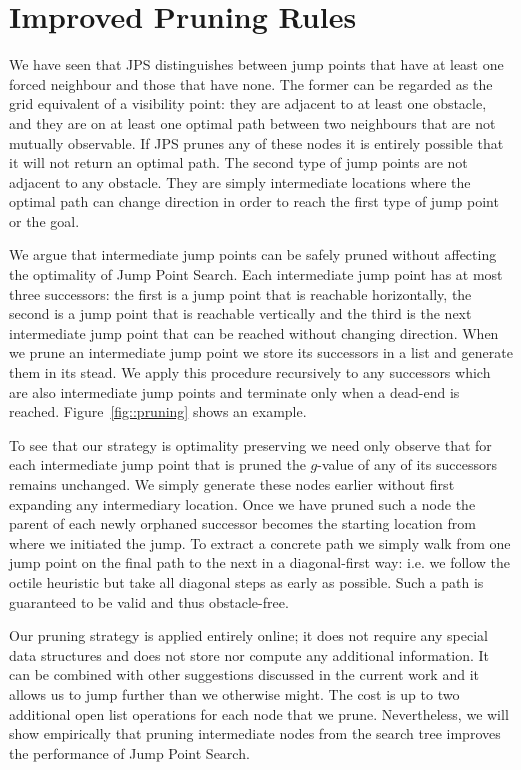 

\section{Improved Pruning Rules}
\label{sec::pruning}
We have seen that JPS distinguishes between jump points that have at least 
one forced neighbour and those that have none.
The former can be regarded as
the grid equivalent of a visibility point: they are adjacent to at least one
obstacle, and they are on at least one optimal path between two neighbours
that are not mutually observable. If JPS prunes any of these nodes it is
entirely possible that it will not return an optimal path.  The second type of
jump points are not adjacent to any obstacle. They are simply intermediate
locations where the optimal path can change direction in order to reach the
first type of jump point or the goal.
\par
We argue that intermediate jump points can be safely pruned without
affecting the optimality of Jump Point Search.  
Each intermediate jump point has at most three successors: the first is a jump 
point that is reachable horizontally, the second is a jump point that is reachable 
vertically and the third is the next intermediate jump point that can be reached 
without changing direction.
When we prune an intermediate jump point we store its successors in a list and
generate them in its stead. We apply this procedure recursively to any
successors which are also intermediate jump points and terminate only when a
dead-end is reached. Figure~\ref{fig::pruning} shows an example.

To see that our strategy is optimality preserving we need only observe that
for each intermediate jump point that is pruned the $g$-value of any of its
successors remains unchanged. We simply generate these nodes earlier without
first expanding any intermediary location.  Once we have pruned such a node 
the parent of each newly orphaned successor becomes the starting location from
where we initiated the jump. To extract a concrete path we simply walk from
one jump point on the final path to the next in a diagonal-first way: i.e. we
follow the octile heuristic but take all diagonal steps as early as possible.
Such a path is guaranteed to be valid and thus obstacle-free.

Our pruning strategy is applied entirely online; it does not require any
special data structures and does not store nor compute any additional
information.  It can be combined with other suggestions discussed in the 
current work and it allows us to jump further than we otherwise might. The 
cost is up to two additional open list operations for each node that we
prune. Nevertheless, we will show empirically that pruning intermediate nodes
from the search tree improves the performance of Jump Point Search.

